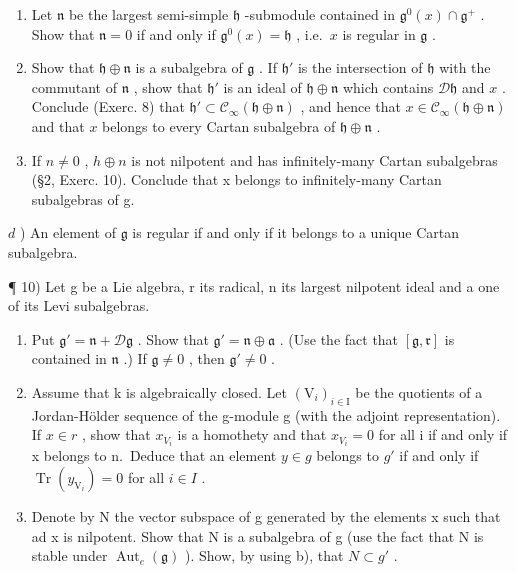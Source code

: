 \begin{enumerate}
\def\labelenumi{\alph{enumi})}
\item
  Let \(\mathfrak{n}\) be the largest semi-simple \(\mathfrak{h}\) -submodule contained in \(\mathfrak{g}^0 (x)\cap \mathfrak{g}^+\) . Show that \(\mathfrak{n} = 0\) if and only if \(\mathfrak{g}^0 (x) = \mathfrak{h}\) , i.e.~\(x\) is regular in \(\mathfrak{g}\) .
\item
  Show that \(\mathfrak{h} \oplus \mathfrak{n}\) is a subalgebra of \(\mathfrak{g}\) . If \(\mathfrak{h}'\) is the intersection of \(\mathfrak{h}\) with the commutant of \(\mathfrak{n}\) , show that \(\mathfrak{h}'\) is an ideal of \(\mathfrak{h} \oplus \mathfrak{n}\) which contains \(\mathcal{D}\mathfrak{h}\) and \(x\) . Conclude (Exerc. 8) that \(\mathfrak{h}' \subset \mathcal{C}_{\infty}(\mathfrak{h} \oplus \mathfrak{n})\) , and hence that \(x \in \mathcal{C}_{\infty}(\mathfrak{h} \oplus \mathfrak{n})\) and that \(x\) belongs to every Cartan subalgebra of \(\mathfrak{h} \oplus \mathfrak{n}\) .
\item
  If \(n \neq 0\) , \(h \oplus n\) is not nilpotent and has infinitely-many Cartan subalgebras (§2, Exerc. 10). Conclude that x belongs to infinitely-many Cartan subalgebras of g.
\end{enumerate}

\(d\) ) An element of \(\mathfrak{g}\) is regular if and only if it belongs to a unique Cartan subalgebra.

¶ 10) Let g be a Lie algebra, r its radical, n its largest nilpotent ideal and a one of its Levi subalgebras.

\begin{enumerate}
\def\labelenumi{\alph{enumi})}
\item
  Put \(\mathfrak{g}' = \mathfrak{n} + \mathcal{D}\mathfrak{g}\) . Show that \(\mathfrak{g}' = \mathfrak{n} \oplus \mathfrak{a}\) . (Use the fact that \([\mathfrak{g}, \mathfrak{r}]\) is contained in \(\mathfrak{n}\) .) If \(\mathfrak{g} \neq 0\) , then \(\mathfrak{g}' \neq 0\) .
\item
  Assume that k is algebraically closed. Let \((\mathrm{V}_{i})_{i\in\mathrm{I}}\) be the quotients of a Jordan-Hölder sequence of the g-module g (with the adjoint representation). If \(x\in r\) , show that \(x_{V_{i}}\) is a homothety and that \(x_{V_{i}}=0\) for all i if and only if x belongs to n.~Deduce that an element \(y\in g\) belongs to \(g'\) if and only if \(\operatorname{Tr}(y_{\mathrm{V}_{i}})=0\) for all \(i\in I\) .
\item
  Denote by N the vector subspace of g generated by the elements x such that ad x is nilpotent. Show that N is a subalgebra of g (use the fact that N is stable under \(\operatorname{Aut}_{e}(\mathfrak{g})\) ). Show, by using b), that \(N \subset g'\) .
\end{enumerate}

